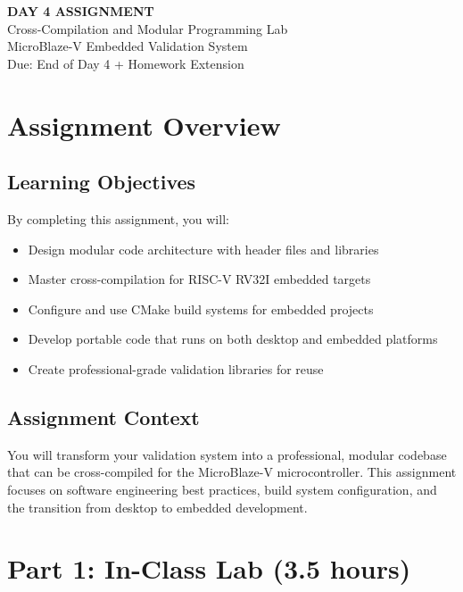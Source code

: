\documentclass[11pt,a4paper]{article}
\begin{document}
\begin{center}
    {\Huge\bfseries\color{codeblue} DAY 4 ASSIGNMENT}\\[0.5cm]
    {\Large Cross-Compilation and Modular Programming Lab}\\[0.3cm]
    {\large MicroBlaze-V Embedded Validation System}\\[0.2cm]
    {\normalsize Due: End of Day 4 + Homework Extension}
\end{center}

\vspace{1cm}

\section{Assignment Overview}

\subsection{Learning Objectives}
By completing this assignment, you will:
\begin{itemize}
    \item Design modular code architecture with header files and libraries
    \item Master cross-compilation for RISC-V RV32I embedded targets
    \item Configure and use CMake build systems for embedded projects
    \item Develop portable code that runs on both desktop and embedded platforms
    \item Create professional-grade validation libraries for reuse
\end{itemize}

\subsection{Assignment Context}
You will transform your validation system into a professional, modular codebase that can be cross-compiled for the MicroBlaze-V microcontroller. This assignment focuses on software engineering best practices, build system configuration, and the transition from desktop to embedded development.

\section{Part 1: In-Class Lab (3.5 hours)}
\end{document}
